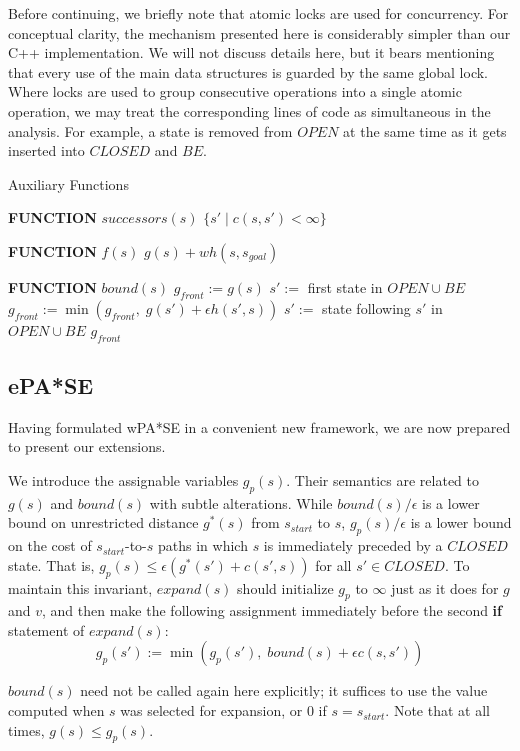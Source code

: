 \documentclass[letterpaper]{article}
\begin{document}
Before continuing, we briefly note that atomic locks are used for concurrency. For conceptual clarity, the mechanism presented here is considerably simpler than our C++ implementation. We will not discuss details here, but it bears mentioning that every use of the main data structures is guarded by the same global lock. Where locks are used to group consecutive operations into a single atomic operation, we may treat the corresponding lines of code as simultaneous in the analysis. For example, a state is removed from $OPEN$ at the same time as it gets inserted into $CLOSED$ and $BE$.

\begin{algorithm}
\caption{Auxiliary Functions}
\label{alg:aux}
\begin{algorithmic}
\STATE \textbf{FUNCTION} $successors(s)$
\RETURN $\{s' \mid c(s,s')<\infty\}$

\STATE \textbf{FUNCTION} $f(s)$
\RETURN $g(s) + wh(s,s_{goal})$

\STATE \textbf{FUNCTION} $bound(s)$
\STATE $g_{front} := g(s)$
\STATE $s' :=$ first state in $OPEN \cup BE$
\STATE $g_{front} := \min(g_{front},\;g(s') + \epsilon h(s',s))$
\STATE $s' :=$ state following $s'$ in $OPEN \cup BE$
\ENDWHILE
\RETURN $g_{front}$
\end{algorithmic}
\end{algorithm}

\subsection{ePA*SE}

Having formulated wPA*SE in a convenient new framework, we are now prepared to present our extensions.

We introduce the assignable variables $g_p(s)$. Their semantics are related to $g(s)$ and $bound(s)$ with subtle alterations. While $bound(s)/\epsilon$ is a lower bound on unrestricted distance $g^*(s)$ from $s_{start}$ to $s$, $g_p(s)/\epsilon$ is a lower bound on the cost of $s_{start}$-to-$s$ paths in which $s$ is immediately preceded by a $CLOSED$ state. That is, $g_p(s) \le \epsilon (g^*(s') + c(s',s))$ for all $s'\in CLOSED$. To maintain this invariant, $expand(s)$ should initialize $g_p$ to $\infty$ just as it does for $g$ and $v$, and then make the following assignment immediately before the second \textbf{if} statement of $expand(s)$:
\[g_p(s') := \min(g_p(s'),\; bound(s) + \epsilon c(s,s'))\]

$bound(s)$ need not be called again here explicitly; it suffices to use the value computed when $s$ was selected for expansion, or $0$ if $s=s_{start}$. Note that at all times, $g(s) \le g_p(s)$.
\end{document}
